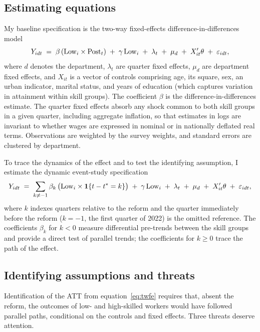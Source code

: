 \subsection{Estimating equations}

My baseline specification is the two-way fixed-effects difference-in-differences model
\begin{equation}
Y_{idt} \;=\; \beta\,(\mathrm{Low}_i\times\mathrm{Post}_t) \;+\; \gamma\,\mathrm{Low}_i \;+\; \lambda_t \;+\; \mu_d
\;+\; X_{it}'\theta \;+\; \varepsilon_{idt},
\label{eq:twfe}
\end{equation}
where $d$ denotes the department, $\lambda_t$ are quarter fixed effects, $\mu_d$ are department fixed effects, and $X_{it}$ is a vector of controls comprising age, its square, sex, an urban indicator, marital status, and years of education (which captures variation in attainment within skill groups). The coefficient $\beta$ is the difference-in-differences estimate. The quarter fixed effects absorb any shock common to both skill groups in a given quarter, including aggregate inflation, so that estimates in logs are invariant to whether wages are expressed in nominal or in nationally deflated real terms. Observations are weighted by the survey weights, and standard errors are clustered by department.

To trace the dynamics of the effect and to test the identifying assumption, I estimate the dynamic event-study specification
\begin{equation}
Y_{idt} \;=\; \sum_{k\neq -1}\beta_k\,\bigl(\mathrm{Low}_i\times\mathbf{1}\{t-t^{\ast}=k\}\bigr)
\;+\; \gamma\,\mathrm{Low}_i \;+\; \lambda_t \;+\; \mu_d \;+\; X_{it}'\theta \;+\; \varepsilon_{idt},
\label{eq:event}
\end{equation}
where $k$ indexes quarters relative to the reform and the quarter immediately before the reform ($k=-1$, the first quarter of 2022) is the omitted reference. The coefficients $\beta_k$ for $k<0$ measure differential pre-trends between the skill groups and provide a direct test of parallel trends; the coefficients for $k\ge 0$ trace the path of the effect.

\subsection{Identifying assumptions and threats}

Identification of the ATT from equation~\eqref{eq:twfe} requires that, absent the reform, the outcomes of low- and high-skilled workers would have followed parallel paths, conditional on the controls and fixed effects. Three threats deserve attention.

